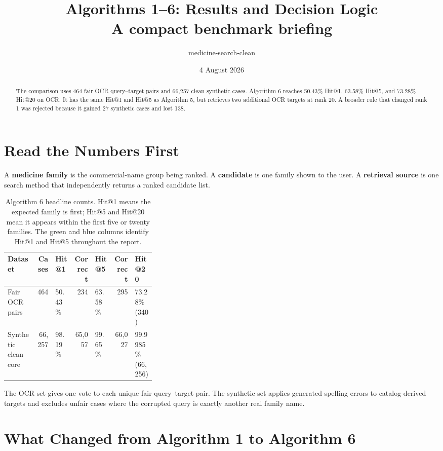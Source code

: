 \documentclass[11pt]{article}
\title{\textbf{Algorithms 1--6: Results and Decision Logic}\\
\large A compact benchmark briefing}
\author{medicine-search-clean}
\date{4 August 2026}
\begin{document}
\maketitle

\begin{abstract}
The comparison uses 464 fair OCR query--target pairs and 66,257 clean synthetic
cases. Algorithm 6 reaches 50.43\% Hit@1, 63.58\% Hit@5, and 73.28\% Hit@20 on
OCR. It has the same Hit@1 and Hit@5 as Algorithm 5, but retrieves two additional
OCR targets at rank 20. A broader rule that changed rank 1 was rejected because
it gained 27 synthetic cases and lost 138.
\end{abstract}

\section{Read the Numbers First}

A \textbf{medicine family} is the commercial-name group being ranked. A
\textbf{candidate} is one family shown to the user. A \textbf{retrieval source}
is one search method that independently returns a ranked candidate list.

\begin{table}[htbp]
\centering
\small
\begin{tabularx}{\linewidth}{@{}L{0.20\linewidth}rGNBNR{0.14\linewidth}@{}}
\toprule
\textbf{Dataset} & \textbf{Cases} & \textbf{Hit@1} & \textbf{Correct} & \textbf{Hit@5} & \textbf{Correct} & \textbf{Hit@20} \\
\midrule
Fair OCR pairs & 464 & 50.43\% & 234 & 63.58\% & 295 & 73.28\% (340) \\
Synthetic clean core & 66,257 & 98.19\% & 65,057 & 99.65\% & 66,027 & 99.9985\% (66,256) \\
\bottomrule
\end{tabularx}
\caption{Algorithm 6 headline counts. Hit@1 means the expected family is first;
Hit@5 and Hit@20 mean it appears within the first five or twenty families. The
green and blue columns identify Hit@1 and Hit@5 throughout the report.}
\label{tab:headline}
\end{table}

The OCR set gives one vote to each unique fair query--target pair. The synthetic
set applies generated spelling errors to catalog-derived targets and excludes
unfair cases where the corrupted query is exactly another real family name.

\section{What Changed from Algorithm 1 to Algorithm 6}
\end{document}

